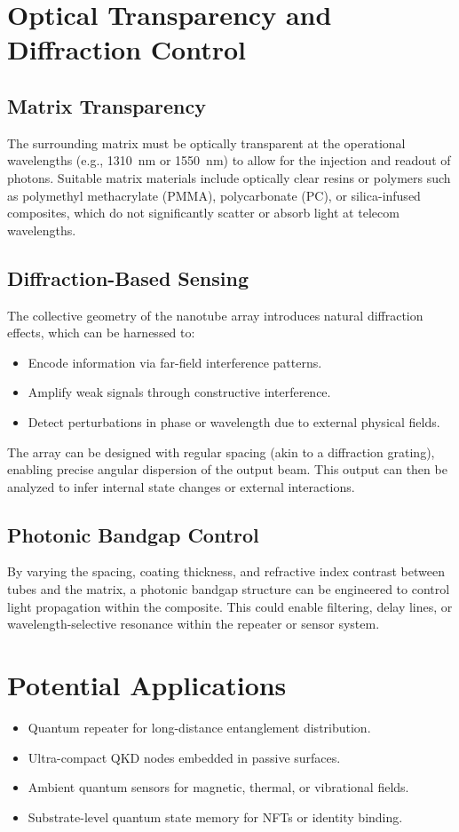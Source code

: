 \documentclass[11pt]{article}
\begin{document}
	\section{Optical Transparency and Diffraction Control}
	
	\subsection{Matrix Transparency}
	The surrounding matrix must be optically transparent at the operational wavelengths (e.g., \SI{1310}{\nano\meter} or \SI{1550}{\nano\meter}) to allow for the injection and readout of photons. Suitable matrix materials include optically clear resins or polymers such as polymethyl methacrylate (PMMA), polycarbonate (PC), or silica-infused composites, which do not significantly scatter or absorb light at telecom wavelengths.
	
	\subsection{Diffraction-Based Sensing}
	The collective geometry of the nanotube array introduces natural diffraction effects, which can be harnessed to:
	\begin{itemize}
		\item Encode information via far-field interference patterns.
		\item Amplify weak signals through constructive interference.
		\item Detect perturbations in phase or wavelength due to external physical fields.
	\end{itemize}
	The array can be designed with regular spacing (akin to a diffraction grating), enabling precise angular dispersion of the output beam. This output can then be analyzed to infer internal state changes or external interactions.
	
	\subsection{Photonic Bandgap Control}
	By varying the spacing, coating thickness, and refractive index contrast between tubes and the matrix, a photonic bandgap structure can be engineered to control light propagation within the composite. This could enable filtering, delay lines, or wavelength-selective resonance within the repeater or sensor system.
	
	\section{Potential Applications}
	\begin{itemize}
		\item Quantum repeater for long-distance entanglement distribution.
		\item Ultra-compact QKD nodes embedded in passive surfaces.
		\item Ambient quantum sensors for magnetic, thermal, or vibrational fields.
		\item Substrate-level quantum state memory for NFTs or identity binding.
	\end{itemize}
	
\end{document}
